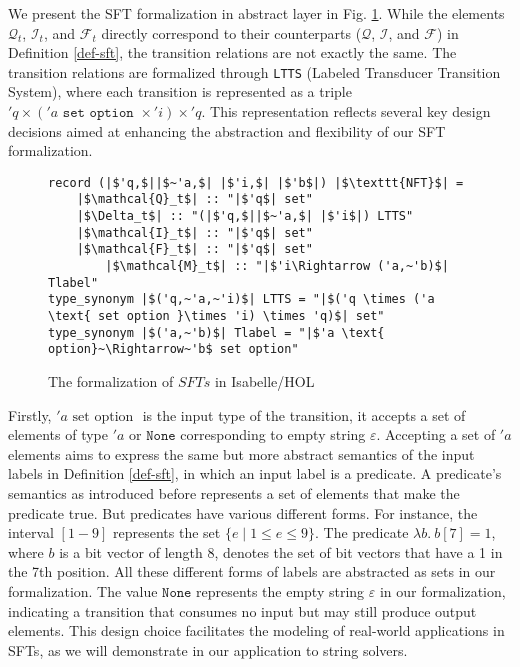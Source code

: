 We present the SFT formalization in abstract layer in Fig. \ref{fig-def-FT}. While the elements $\mathcal{Q}_t$, $\mathcal{I}_t$, and $\mathcal{F}_t$ directly correspond to their counterparts ($\mathcal{Q}$, $\mathcal{I}$, and $\mathcal{F}$) in Definition \ref{def-sft}, the transition relations are not exactly the same.
%
The transition relations are formalized through \texttt{LTTS} (Labeled Transducer Transition System), where each transition is represented as a triple $'q \times ('a \texttt{ set option }\times 'i) \times 'q$. This representation reflects several key design decisions aimed at enhancing the abstraction and flexibility of our SFT formalization.
\begin{figure}[hbt!]
	\begin{lstlisting}
record (|$'q,$||$~'a,$| |$'i,$| |$'b$|) |$\texttt{NFT}$| =
	|$\mathcal{Q}_t$| :: "|$'q$| set"
	|$\Delta_t$| :: "(|$'q,$||$~'a,$| |$'i$|) LTTS"
	|$\mathcal{I}_t$| :: "|$'q$| set"
	|$\mathcal{F}_t$| :: "|$'q$| set"
        |$\mathcal{M}_t$| :: "|$'i\Rightarrow ('a,~'b)$| Tlabel"
type_synonym |$('q,~'a,~'i)$| LTTS = "|$('q \times ('a \text{ set option }\times 'i) \times 'q)$| set"
type_synonym |$('a,~'b)$| Tlabel = "|$'a \text{ option}~\Rightarrow~'b$ set option"
	\end{lstlisting}
\caption{The formalization of $SFTs$ in Isabelle/HOL}
\label{fig-def-FT}
\end{figure}




Firstly, $'a \text{ set option }$ is the input type of the transition, it accepts a set of elements of type $'a$ or $\texttt{None}$ corresponding to empty string $\varepsilon$. 
Accepting a set of $'a$ elements aims to express the same but more abstract semantics of the input labels in Definition \ref{def-sft}, in which an input label is a predicate. A predicate's semantics as introduced before represents a set of elements that make the predicate true. But predicates have various different forms. For instance, the interval $[1-9]$ represents the set $\{e \mid 1 \leq e \leq 9\}$. The predicate $\lambda b.~ b[7] = 1$, where $b$ is a bit vector of length 8, denotes the set of bit vectors that have a 1 in the 7th position. All these different forms of labels are abstracted as sets in our formalization.
%
The value $\texttt{None}$ represents the empty string $\varepsilon$ in our formalization, indicating a transition that consumes no input but may still produce output elements. This design choice facilitates the modeling of real-world applications in SFTs, as we will demonstrate in our application to string solvers.

